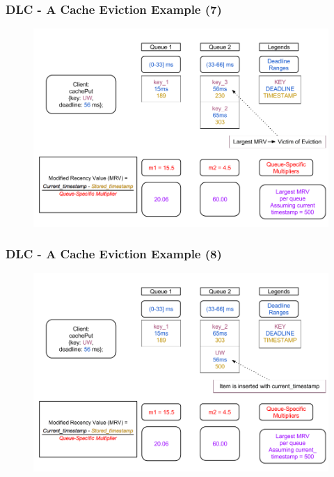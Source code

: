 \documentclass{beamer}
\begin{document}
\begin{frame}
  \frametitle{DLC - A Cache Eviction Example (7)}
  \begin{figure}
    \begin{center}
      \centerline{\includegraphics[scale=0.33]{img/DLC_V5_7.png}}
    \end{center}
  \end{figure}
\end{frame}

\begin{frame}
  \frametitle{DLC - A Cache Eviction Example (8)}
  \begin{figure}
    \begin{center}
      \centerline{\includegraphics[scale=0.33]{img/DLC_V5_8.png}}
    \end{center}
  \end{figure}
\end{frame}
\end{document}
